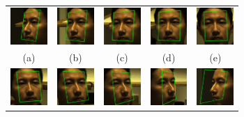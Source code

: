\documentclass[10pt,journal,letterpaper,compsoc]{IEEEtran} %
\begin{document}
\begin{figure}
\centering
{\small
\begin{tabular}{ccccc}
\includegraphics[height=0.55in]{figures_cvpr/5} &
\includegraphics[height=0.55in]{figures_cvpr/7} &
\includegraphics[height=0.55in]{figures_cvpr/09} &
\includegraphics[height=0.55in]{figures_cvpr/11} &
\includegraphics[height=0.55in]{figures_cvpr/13} \vspace{0mm} \\ 
(a) & (b) & (c) & (d) & (e)\\
\includegraphics[height=0.55in]{figures_cvpr/15} &
\includegraphics[height=0.55in]{figures_cvpr/17} &
\includegraphics[height=0.55in]{figures_cvpr/19} &
\includegraphics[height=0.55in]{figures_cvpr/21} &
\includegraphics[height=0.55in]{figures_cvpr/3} \vspace{0mm} \\ 

\end{tabular}}
\end{figure}
\end{document}
